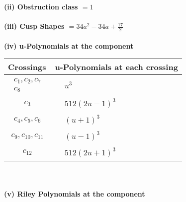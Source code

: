 \documentclass[1p]{elsarticle_modified}
\theoremstyle{definition}
\begin{document}
\flushleft \textbf{(ii) Obstruction class $= 1$}\\~\\
\flushleft \textbf{(iii) Cusp Shapes $= 34 a^2-34 a+\frac{17}{2}$}\\~\\
\newpage\renewcommand{\arraystretch}{1}
\flushleft \textbf{(iv) u-Polynomials at the component}\newline \\
\begin{tabular}{m{50pt}|m{274pt}}
Crossings & \hspace{64pt}u-Polynomials at each crossing \\
\hline $$\begin{aligned}c_{1},c_{2},c_{7}\\c_{8}\end{aligned}$$&$\begin{aligned}
&u^3
\end{aligned}$\\
\hline $$\begin{aligned}c_{3}\end{aligned}$$&$\begin{aligned}
&512(2 u-1)^3
\end{aligned}$\\
\hline $$\begin{aligned}c_{4},c_{5},c_{6}\end{aligned}$$&$\begin{aligned}
&(u+1)^3
\end{aligned}$\\
\hline $$\begin{aligned}c_{9},c_{10},c_{11}\end{aligned}$$&$\begin{aligned}
&(u-1)^3
\end{aligned}$\\
\hline $$\begin{aligned}c_{12}\end{aligned}$$&$\begin{aligned}
&512(2 u+1)^3
\end{aligned}$\\
\hline
\end{tabular}\\~\\
\newpage\renewcommand{\arraystretch}{1}
\flushleft \textbf{(v) Riley Polynomials at the component}\newline \\
\end{document}
